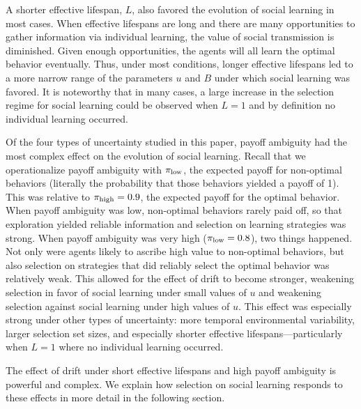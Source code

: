 \documentclass[letterpaper,11.5pt]{scrartcl}
\begin{document}
A shorter effective lifespan, $L$, also favored the evolution of social learning in most cases. When effective lifespans are long and there are many opportunities to gather information via individual learning, the value of social transmission is diminished. Given enough opportunities, the agents will all learn the optimal behavior eventually. Thus, under most conditions, longer effective lifespans led to a more narrow range of the parameters $u$ and $B$ under which social learning was favored. It is noteworthy that in many cases, a large increase in the selection regime for social learning could be observed when $L=1$ and by definition no individual learning occurred. 

Of the four types of uncertainty studied in this paper, payoff ambiguity had the most complex effect on the evolution of social learning. Recall that we operationalize payoff ambiguity with $\pi_{\mathrm{low}}$, the expected payoff for non-optimal behaviors (literally the probability that those behaviors yielded a payoff of 1). This was relative to $\pi_{\mathrm{high}} = 0.9$, the expected payoff for the optimal behavior. When payoff ambiguity was low, non-optimal behaviors rarely paid off, so that exploration yielded reliable information and selection on learning strategies was  strong. When payoff ambiguity was very high ($\pi_{\mathrm{low}} = 0.8$), two things happened. Not only were agents likely to ascribe high value to non-optimal behaviors, but also selection on strategies that did reliably select the optimal behavior was relatively weak. This allowed for the effect of drift to become stronger, weakening selection in favor of social learning under small values of $u$ and weakening selection against social learning under high values of $u$. This effect was especially strong under other types of uncertainty: more temporal environmental variability, larger selection set sizes, and especially shorter effective lifespans---particularly when $L=1$ where no individual learning occurred. 

The effect of drift under short effective lifespans and high payoff ambiguity is powerful and complex. We explain how selection on social learning responds to these effects in more detail in the following section. 
\end{document}
